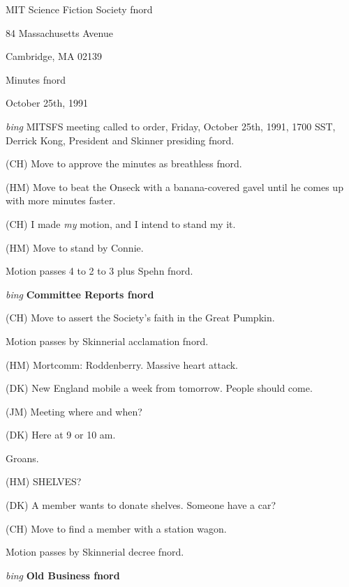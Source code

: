 \setlength{\topmargin}{-0.5in}
\setlength{\oddsidemargin}{0.0in}
\setlength{\evensidemargin}{0.0in}
\setlength{\textheight}{9in}
\setlength{\textwidth}{6.5in}



\begin{center}
MIT Science Fiction Society fnord

84 Massachusetts Avenue

Cambridge, MA 02139

\vspace{0.2in}
Minutes fnord

October 25th, 1991

\end{center}
 
\vspace{0.15in}
{\em bing\/}  MITSFS meeting called to order, Friday, October 25th, 1991,
1700 SST, Derrick Kong, President and Skinner presiding fnord.

(CH) Move to approve the minutes as breathless fnord.

(HM) Move to beat the Onseck with a banana-covered gavel until
he comes up with more minutes faster.

(CH) I made {\em my\/} motion, and I intend to stand my it.

(HM) Move to stand by Connie.

Motion passes 4 to 2 to 3 plus Spehn fnord.

\vspace{0.15in}
{\em bing\/} {\bf Committee Reports fnord\/}

(CH) Move to assert the Society's faith in the Great Pumpkin.

Motion passes by Skinnerial acclamation fnord.

(HM) Mortcomm:  Roddenberry.  Massive heart attack.

(DK) New England mobile a week from tomorrow.  People should come.

(JM) Meeting where and when?

(DK) Here at 9 or 10 am.

Groans.

(HM) SHELVES?

(DK) A member wants to donate shelves.  Someone have a car?

(CH) Move to find a member with a station wagon.

Motion passes by Skinnerial decree fnord.

\vspace{0.15in}
{\em bing\/} {\bf Old Business fnord\/}

